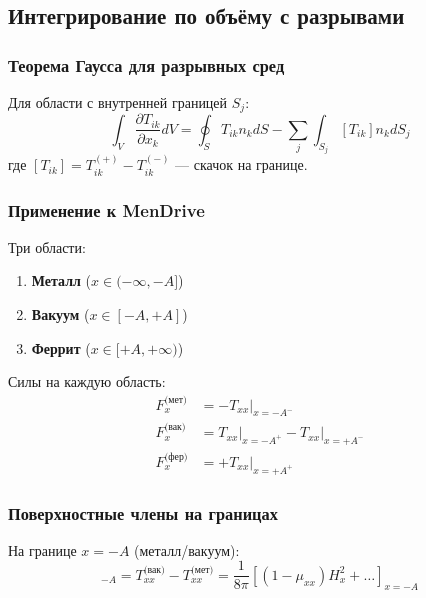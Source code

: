 \documentclass[a4paper,12pt]{article}
\begin{document}
\subsection{Интегрирование по объёму с разрывами}

\subsubsection{Теорема Гаусса для разрывных сред}

Для области с внутренней границей $S_j$:
\begin{equation}
\boxed{
\int_V \frac{\partial T_{ik}}{\partial x_k} dV = \oint_S T_{ik} n_k dS - \sum_j \int_{S_j} [T_{ik}] n_k dS_j
}
\label{eq:gauss_discontinuous}
\end{equation}
где $[T_{ik}] = T_{ik}^{(+)} - T_{ik}^{(-)}$ --- скачок на границе.

\subsubsection{Применение к MenDrive}

Три области:
\begin{enumerate}
    \item \textbf{Металл} ($x \in (-\infty, -A]$)
    \item \textbf{Вакуум} ($x \in [-A, +A]$)
    \item \textbf{Феррит} ($x \in [+A, +\infty)$)
\end{enumerate}

Силы на каждую область:
\begin{equation}
\boxed{
\begin{aligned}
F_x^{\text{(мет)}} &= -T_{xx}\big|_{x=-A^-} \\
F_x^{\text{(вак)}} &= T_{xx}\big|_{x=-A^+} - T_{xx}\big|_{x=+A^-} \\
F_x^{\text{(фер)}} &= +T_{xx}\big|_{x=+A^+}
\end{aligned}
}
\label{eq:forces_by_region}
\end{equation}

\subsubsection{Поверхностные члены на границах}

На границе $x = -A$ (металл/вакуум):
\begin{equation}
[T_{xx}]_{-A} = T_{xx}^{\text{(вак)}} - T_{xx}^{\text{(мет)}} = \frac{1}{8\pi}\left[(1-\mu_{xx})H_x^2 + \ldots\right]_{x=-A}
\label{eq:jump_left}
\end{equation}
\end{document}
